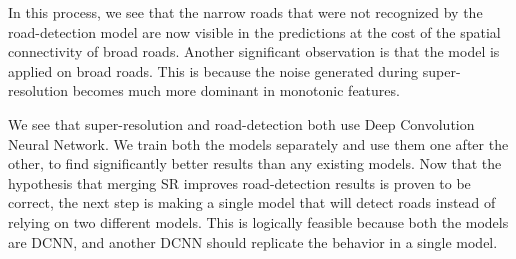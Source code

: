 In this process, we see that the narrow roads that were not recognized by the road-detection model are now visible in the predictions at the cost of the spatial connectivity of broad roads. Another significant observation is that the model is applied on broad roads. This is because the noise generated during super-resolution becomes much more dominant in monotonic features.

We see that super-resolution and road-detection both use Deep Convolution Neural Network. We train both the models separately and use them one after the other, to find significantly better results than any existing models. Now that the hypothesis that merging SR improves road-detection results is proven to be correct, the next step is making a single model that will detect roads instead of relying on two different models. This is logically feasible because both the models are DCNN, and another DCNN should replicate the behavior in a single model.

\pagebreak
